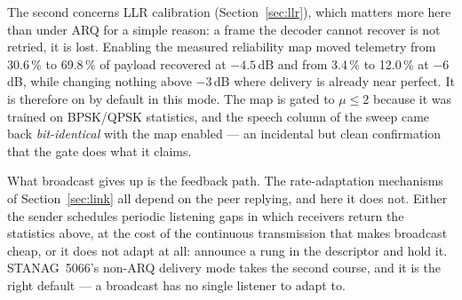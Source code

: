 The second concerns LLR calibration (Section~\ref{sec:llr}), which
matters more here than under ARQ for a simple reason: a frame the
decoder cannot recover is not retried, it is lost.  Enabling the
measured reliability map moved telemetry from 30.6\,\% to 69.8\,\% of
payload recovered at $-4.5$\,dB and from 3.4\,\% to 12.0\,\% at
$-6$\,dB, while changing nothing above $-3$\,dB where delivery is
already near perfect.  It is therefore on by default in this mode.  The
map is gated to $\mu \le 2$ because it was trained on BPSK/QPSK
statistics, and the speech column of the sweep came back
\emph{bit-identical} with the map enabled --- an incidental but clean
confirmation that the gate does what it claims.

What broadcast gives up is the feedback path.  The rate-adaptation
mechanisms of Section~\ref{sec:link} all depend on the peer replying,
and here it does not.  Either the sender schedules periodic listening
gaps in which receivers return the statistics above, at the cost of the
continuous transmission that makes broadcast cheap, or it does not
adapt at all: announce a rung in the descriptor and hold it.
STANAG~5066's non-ARQ delivery mode takes the second course, and it is
the right default --- a broadcast has no single listener to adapt to.
